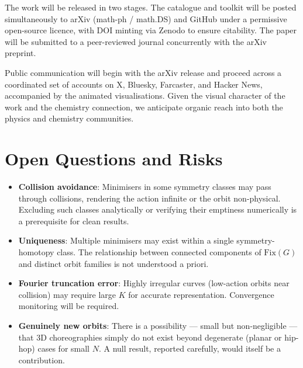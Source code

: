 \documentclass[12pt, a4paper]{article}
\theoremstyle{definition}
\begin{document}
The work will be released in two stages. The catalogue and toolkit will
be posted simultaneously to arXiv (math-ph / math.DS) and GitHub under
a permissive open-source licence, with DOI minting via Zenodo to ensure
citability. The paper will be submitted to a peer-reviewed journal
concurrently with the arXiv preprint.

Public communication will begin with the arXiv release and proceed across
a coordinated set of accounts on X, Bluesky, Farcaster, and Hacker News,
accompanied by the animated visualisations. Given the visual character of
the work and the chemistry connection, we anticipate organic reach into
both the physics and chemistry communities.

\section{Open Questions and Risks}

\begin{itemize}[leftmargin=1.8em]
  \item \textbf{Collision avoidance}: Minimisers in some symmetry classes
        may pass through collisions, rendering the action infinite or
        the orbit non-physical. Excluding such classes analytically or
        verifying their emptiness numerically is a prerequisite for clean
        results.
  \item \textbf{Uniqueness}: Multiple minimisers may exist within a
        single symmetry-homotopy class. The relationship between connected
        components of $\mathrm{Fix}(G)$ and distinct orbit families is
        not understood a priori.
  \item \textbf{Fourier truncation error}: Highly irregular curves
        (low-action orbits near collision) may require large $K$ for
        accurate representation. Convergence monitoring will be required.
  \item \textbf{Genuinely new orbits}: There is a possibility — small
        but non-negligible — that 3D choreographies simply do not exist
        beyond degenerate (planar or hip-hop) cases for small $N$. A
        null result, reported carefully, would itself be a contribution.
\end{itemize}
\end{document}
